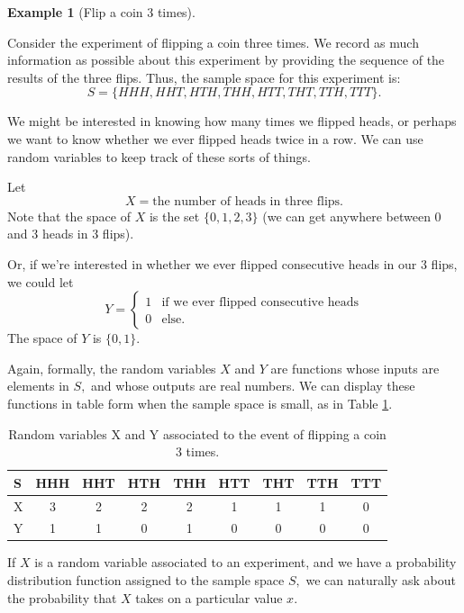 \documentclass[
]{book}
\theoremstyle{definition}
\theoremstyle{definition}
\newtheorem{example}{Example}[chapter]
\theoremstyle{definition}
\theoremstyle{definition}
\theoremstyle{remark}
\begin{document}
\begin{example}[Flip a coin 3 times]
\protect\hypertarget{exm:flip-three-times}{}\label{exm:flip-three-times}

Consider the experiment of flipping a coin three times. We record as much information as possible about this experiment by providing the sequence of the results of the three flips. Thus, the sample space for this experiment is:
\[S = \{HHH,HHT,HTH,THH,HTT,THT,TTH,TTT\}.\]

We might be interested in knowing how many times we flipped heads, or perhaps we want to know whether we ever flipped heads twice in a row. We can use random variables to keep track of these sorts of things.

Let \[X = \text{the number of heads in three flips}.\] Note that the space of \(X\) is the set \(\{0, 1, 2, 3\}\) (we can get anywhere between 0 and 3 heads in 3 flips).

Or, if we're interested in whether we ever flipped consecutive heads in our 3 flips, we could let
\[Y =  \begin{cases}
    1 & \text{if we ever flipped consecutive heads} \\
    0 & \text{else.}
    \end{cases}\]
The space of \(Y\) is \(\{0,1\}\).

Again, formally, the random variables \(X\) and \(Y\) are functions whose inputs are elements in \(S,\) and whose outputs are real numbers. We can display these functions in table form when the sample space is small, as in Table \ref{tab:flip-3-coins}.

\begin{table}[!h]
\centering
\caption{\label{tab:flip-3-coins}Random variables X and Y associated to the event of flipping a coin 3 times.}
\centering
\begin{tabular}[t]{>{}l||c|c|c|c|c|c|c|c}
\hline
S & HHH & HHT & HTH & THH & HTT & THT & TTH & TTT\\
\hline
X & 3 & 2 & 2 & 2 & 1 & 1 & 1 & 0\\
\hline
Y & 1 & 1 & 0 & 1 & 0 & 0 & 0 & 0\\
\hline
\end{tabular}
\end{table}

\end{example}

If \(X\) is a random variable associated to an experiment, and we have a probability distribution function assigned to the sample space \(S,\) we can naturally ask about the probability that \(X\) takes on a particular value \(x\).
\end{document}
